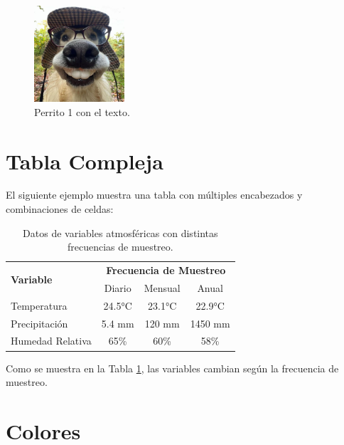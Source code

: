 \documentclass[12pt]{article}
\begin{document}
\lipsum[3]

\begin{figure}  %
    \centering
    \includegraphics[width=0.3\textwidth]{dog1}
    \caption{Perrito 1 con el texto.}
    \label{fig:wrapfigure}
\end{figure}

\lipsum[4]

\section{Tabla Compleja}

El siguiente ejemplo muestra una tabla con múltiples encabezados y combinaciones de celdas:

\begin{table}[h]
    \centering
    \begin{tabular}{|l|c|c|c|}
        \hline
        \multirow{2}{*}{\textbf{Variable}} & \multicolumn{3}{c|}{\textbf{Frecuencia de Muestreo}} \\ \cline{2-4}
        & Diario & Mensual & Anual \\ \hline
        Temperatura & 24.5°C & 23.1°C & 22.9°C \\ \hline
        Precipitación & 5.4 mm & 120 mm & 1450 mm \\ \hline
        Humedad Relativa & 65\% & 60\% & 58\% \\ \hline
    \end{tabular}
    \caption{Datos de variables atmosféricas con distintas frecuencias de muestreo.}
    \label{tab:variables}
\end{table}

Como se muestra en la Tabla \ref{tab:variables}, las variables cambian según la frecuencia de muestreo.







\section{Colores}
\end{document}

